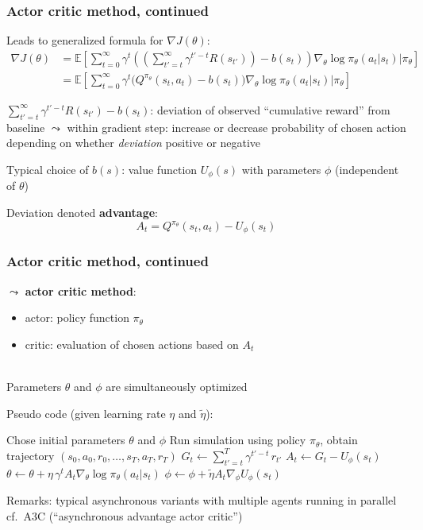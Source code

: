 \documentclass[t]{beamer}
\begin{document}
\begin{frame}
\frametitle{Actor critic method, continued}
Leads to generalized formula for $\nabla J(\theta)$:
\[
\begin{split}
\nabla J(\theta)
&= \mathbb{E}\!\left[ \sum_{t=0}^{\infty} \gamma^{t} \left( \left(\sum_{t'=t}^{\infty} \gamma^{t'-t} R(s_{t'})\right) - b(s_t) \right) \nabla_{\theta} \log \pi_{\theta}(a_t \vert s_t) \Big\vert \pi_{\theta} \right] \\
&= \mathbb{E}\!\left[ \sum_{t=0}^{\infty} \gamma^{t} \Big( Q^{\pi_{\theta}}(s_t, a_t) - b(s_t) \Big) \nabla_{\theta} \log \pi_{\theta}(a_t \vert s_t) \Big\vert \pi_{\theta} \right]
\end{split}
\]

$\sum_{t'=t}^{\infty} \gamma^{t'-t} R(s_{t'}) - b(s_t)$: deviation of observed ``cumulative reward'' from baseline $\leadsto$ within gradient step: increase or decrease probability of chosen action depending on whether \emph{deviation} positive or negative

\medskip

Typical choice of $b(s)$: value function $U_{\phi}(s)$ with parameters $\phi$ (independent of $\theta$)

Deviation denoted \textbf{advantage}:
\[
A_t = Q^{\pi_{\theta}}(s_t, a_t) - U_{\phi}(s_t)
\]
\end{frame}



\begin{frame}
\frametitle{Actor critic method, continued}
$\leadsto$ \textbf{actor critic method}:\\
\begin{itemize}
\item actor: policy function $\pi_{\theta}$
\item critic: evaluation of chosen actions based on $A_t$
\end{itemize}\\
Parameters $\theta$ and $\phi$ are simultaneously optimized

Pseudo code (given learning rate $\eta$ and $\tilde{\eta}$):
\begin{algorithmic}[1]
\State Chose initial parameters $\theta$ and $\phi$
    \State Run simulation using policy $\pi_{\theta}$, obtain trajectory $(s_0, a_0, r_0, \dots, s_T, a_T, r_T)$
        \State $G_t \gets \sum_{t'=t}^T \gamma^{t'-t} \, r_{t'}$
        \State $A_t \gets G_t - U_{\phi}(s_t)$
        \State $\theta \gets \theta + \eta \, \gamma^t A_t \nabla_{\theta} \log \pi_{\theta}(a_t \vert s_t)$ 
        \State $\phi \gets \phi + \tilde{\eta} A_t \nabla_{\phi} U_{\phi}(s_t)$ 
    \EndFor
\EndFor
\end{algorithmic}

Remarks: typical asynchronous variants with multiple agents running in parallel cf.\ A3C (``asynchronous advantage actor critic'') \nocite{Mnih2016}
\end{frame}
\end{document}
